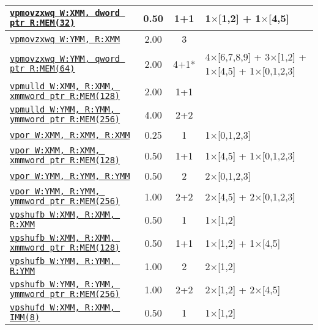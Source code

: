 \documentclass[a4paper,english,fontsize=9]{scrartcl}
\begin{document}
\begin{longtable}{p{}ccL{.25\textwidth}}
  \midrule
  \texttt{\href{https://felixcloutier.com/x86/PMOVZX.html}{vpmovzxwq W:XMM, dword ptr R:MEM(32)}} & 0.50 & 1+1 & 1\(\times\)[1,2] + 1\(\times\)[4,5] \\
  \midrule
  \texttt{\href{https://felixcloutier.com/x86/PMOVZX.html}{vpmovzxwq W:YMM, R:XMM}} & 2.00 & 3 &  \\
  \midrule
  \texttt{\href{https://felixcloutier.com/x86/PMOVZX.html}{vpmovzxwq W:YMM, qword ptr R:MEM(64)}} & 2.00 & 4+1* & 4\(\times\)[6,7,8,9] + 3\(\times\)[1,2] + 1\(\times\)[4,5] + 1\(\times\)[0,1,2,3] \\
  \midrule
  \texttt{\href{https://felixcloutier.com/x86/PMULLD:PMULLQ.html}{vpmulld W:XMM, R:XMM, xmmword ptr R:MEM(128)}} & 2.00 & 1+1 &  \\
  \midrule
  \texttt{\href{https://felixcloutier.com/x86/PMULLD:PMULLQ.html}{vpmulld W:YMM, R:YMM, ymmword ptr R:MEM(256)}} & 4.00 & 2+2 &  \\
  \midrule
  \texttt{\href{https://felixcloutier.com/x86/POR.html}{vpor W:XMM, R:XMM, R:XMM}} & 0.25 & 1 & 1\(\times\)[0,1,2,3] \\
  \midrule
  \texttt{\href{https://felixcloutier.com/x86/POR.html}{vpor W:XMM, R:XMM, xmmword ptr R:MEM(128)}} & 0.50 & 1+1 & 1\(\times\)[4,5] + 1\(\times\)[0,1,2,3] \\
  \midrule
  \texttt{\href{https://felixcloutier.com/x86/POR.html}{vpor W:YMM, R:YMM, R:YMM}} & 0.50 & 2 & 2\(\times\)[0,1,2,3] \\
  \midrule
  \texttt{\href{https://felixcloutier.com/x86/POR.html}{vpor W:YMM, R:YMM, ymmword ptr R:MEM(256)}} & 1.00 & 2+2 & 2\(\times\)[4,5] + 2\(\times\)[0,1,2,3] \\
  \midrule
  \texttt{\href{https://felixcloutier.com/x86/PSHUFB.html}{vpshufb W:XMM, R:XMM, R:XMM}} & 0.50 & 1 & 1\(\times\)[1,2] \\
  \midrule
  \texttt{\href{https://felixcloutier.com/x86/PSHUFB.html}{vpshufb W:XMM, R:XMM, xmmword ptr R:MEM(128)}} & 0.50 & 1+1 & 1\(\times\)[1,2] + 1\(\times\)[4,5] \\
  \midrule
  \texttt{\href{https://felixcloutier.com/x86/PSHUFB.html}{vpshufb W:YMM, R:YMM, R:YMM}} & 1.00 & 2 & 2\(\times\)[1,2] \\
  \midrule
  \texttt{\href{https://felixcloutier.com/x86/PSHUFB.html}{vpshufb W:YMM, R:YMM, ymmword ptr R:MEM(256)}} & 1.00 & 2+2 & 2\(\times\)[1,2] + 2\(\times\)[4,5] \\
  \midrule
  \texttt{\href{https://felixcloutier.com/x86/PSHUFD.html}{vpshufd W:XMM, R:XMM, IMM(8)}} & 0.50 & 1 & 1\(\times\)[1,2] \\

\end{longtable}
\end{document}
